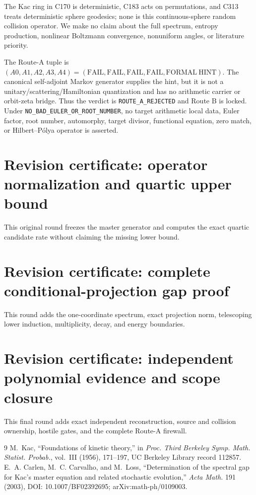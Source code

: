 \documentclass[9pt]{extarticle}
\begin{document}
The Kac ring in C170 is deterministic, C183 acts on permutations, and C313
treats deterministic sphere geodesics; none is this continuous-sphere random
collision operator.  We make no claim about the full spectrum, entropy
production, nonlinear Boltzmann convergence, nonuniform angles, or literature
priority.

The Route-A tuple is
$(A0,A1,A2,A3,A4)=(\mathrm{FAIL},\mathrm{FAIL},\mathrm{FAIL},
\mathrm{FAIL},\mathrm{FORMAL\ HINT})$.  The canonical self-adjoint Markov
generator supplies the hint, but it is not a unitary/scattering/Hamiltonian
quantization and has no arithmetic carrier or orbit-zeta bridge.  Thus the
verdict is \texttt{ROUTE\_A\_REJECTED} and Route B is locked.  Under
\texttt{NO\_BAD\_EULER\_OR\_ROOT\_NUMBER}, no target arithmetic local data,
Euler factor, root number, automorphy, target divisor, functional equation,
zero match, or Hilbert--P\'olya operator is asserted.
\fi

\ifcase\CRevisionRound
\section*{Revision certificate: operator normalization and quartic upper bound}
This original round freezes the master generator and computes the exact
quartic candidate rate without claiming the missing lower bound.
\or
\section*{Revision certificate: complete conditional-projection gap proof}
This round adds the one-coordinate spectrum, exact projection norm,
telescoping lower induction, multiplicity, decay, and energy boundaries.
\else
\section*{Revision certificate: independent polynomial evidence and scope closure}
This final round adds exact independent reconstruction, source and collision
ownership, hostile gates, and the complete Route-A firewall.
\fi

\begin{thebibliography}{9}
 M.~Kac, ``Foundations of kinetic theory,'' in
\emph{Proc. Third Berkeley Symp. Math. Statist. Probab.}, vol.~III (1956),
171--197, UC Berkeley Library record 112857.
 E.~A. Carlen, M.~C. Carvalho, and M.~Loss,
``Determination of the spectral gap for Kac's master equation and related
stochastic evolution,'' \emph{Acta Math.} 191 (2003),
DOI: 10.1007/BF02392695; arXiv:math-ph/0109003.
\end{thebibliography}
\end{document}
